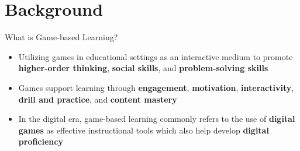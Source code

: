 \documentclass{beamer}
\begin{document}
	
	\section{Background}
	\begin{frame}{What is Game-based Learning?}
		\label{link1}
		
		\begin{itemize}
			\item Utilizing games in educational settings as an interactive medium to promote {\color{blue}\textbf{higher-order thinking}}, {\color{blue}\textbf{social skills}}, and {\color{blue}\textbf{problem-solving skills}} \newline
			\item Games support learning through {\color{blue}\textbf{engagement}}, {\color{blue}\textbf{motivation}}, {\color{blue}\textbf{interactivity}}, 
			{\color{blue}\textbf{drill and practice}}, and {\color{blue}\textbf{content mastery}} \newline
			\item In the digital era, game-based learning commonly refers to the use of {\color{blue}\textbf{digital games}} as effective instructional tools which also help develop {\color{blue}\textbf{digital proficiency}} 
			
		\end{itemize}
		
	\end{frame}

		
		
\end{document}

